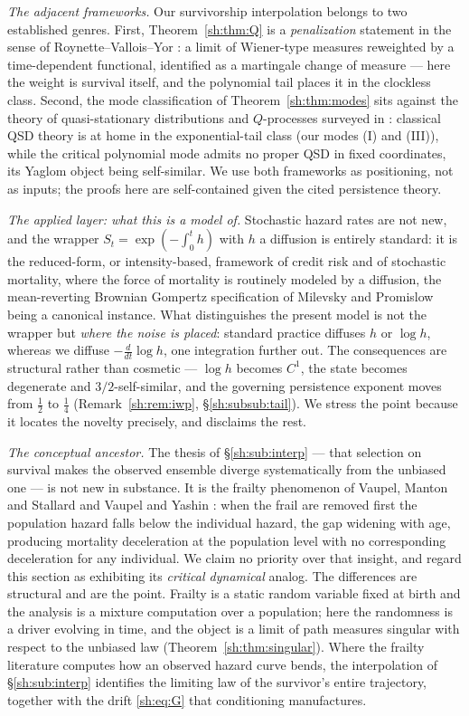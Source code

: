 \documentclass[11pt]{article}
\numberwithin{equation}{section}
\theoremstyle{plain}
\theoremstyle{definition}
\theoremstyle{remark}
\begin{document}
\emph{The adjacent frameworks.} Our survivorship interpolation belongs
to two established genres. First, Theorem~\ref{sh:thm:Q} is a
\emph{penalization} statement in the sense of Roynette--Vallois--Yor
\cite{RVY06}: a limit of Wiener-type measures reweighted by a
time-dependent functional, identified as a martingale change of measure
--- here the weight is survival itself, and the polynomial tail places
it in the clockless class. Second, the mode classification of
Theorem~\ref{sh:thm:modes} sits against the theory of quasi-stationary
distributions and $Q$-processes surveyed in \cite{MV12}: classical QSD
theory is at home in the exponential-tail class (our modes (I) and
(III)), while the critical polynomial mode admits no proper QSD in fixed
coordinates, its Yaglom object being self-similar. We use both
frameworks as positioning, not as inputs; the proofs here are
self-contained given the cited persistence theory.

\emph{The applied layer: what this is a model of.} Stochastic hazard
rates are not new, and the wrapper $S_t=\exp(-\int_0^th)$ with $h$ a
diffusion is entirely standard: it is the reduced-form, or
intensity-based, framework of credit risk \cite{Lan04} and of stochastic
mortality, where the force of mortality is routinely modeled by a
diffusion, the mean-reverting Brownian Gompertz specification of Milevsky
and Promislow \cite{MP01} being a canonical instance. What distinguishes
the present model is not the wrapper but \emph{where the noise is
placed}: standard practice diffuses $h$ or $\log h$, whereas we diffuse
$-\tfrac{d}{dt}\log h$, one integration further out. The consequences are
structural rather than cosmetic --- $\log h$ becomes $C^1$, the state
becomes degenerate and $3/2$-self-similar, and the governing persistence
exponent moves from $\tfrac12$ to $\tfrac14$ (Remark~\ref{sh:rem:iwp},
\S\ref{sh:subsub:tail}). We stress the point because it locates the
novelty precisely, and disclaims the rest.

\emph{The conceptual ancestor.} The thesis of \S\ref{sh:sub:interp} ---
that selection on survival makes the observed ensemble diverge
systematically from the unbiased one --- is not new in substance. It is
the frailty phenomenon of Vaupel, Manton and Stallard \cite{VMS79} and
Vaupel and Yashin \cite{VY85}: when the frail are removed first the
population hazard falls below the individual hazard, the gap widening
with age, producing mortality deceleration at the population level with
no corresponding deceleration for any individual. We claim no priority
over that insight, and regard this section as exhibiting its
\emph{critical dynamical} analog. The differences are structural and
are the point. Frailty is a static random variable fixed at birth and the
analysis is a mixture computation over a population; here the randomness
is a driver evolving in time, and the object is a limit of path measures
singular with respect to the unbiased law
(Theorem~\ref{sh:thm:singular}). Where the frailty literature computes
how an observed hazard curve bends, the interpolation of
\S\ref{sh:sub:interp} identifies the limiting law of the survivor's
entire trajectory, together with the drift \eqref{sh:eq:G} that
conditioning manufactures.
\end{document}
